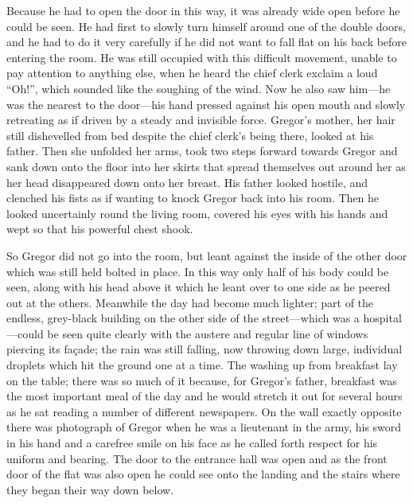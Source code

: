 Because he had to open the door in this way, it was already wide open
before he could be seen. He had first to slowly turn himself around one
of the double doors, and he had to do it very carefully if he did not
want to fall flat on his back before entering the room. He was still
occupied with this difficult movement, unable to pay attention to
anything else, when he heard the chief clerk exclaim a loud “Oh!”,
which sounded like the soughing of the wind. Now he also saw him—he was
the nearest to the door—his hand pressed against his open mouth and
slowly retreating as if driven by a steady and invisible force.
Gregor’s mother, her hair still dishevelled from bed despite the chief
clerk’s being there, looked at his father. Then she unfolded her arms,
took two steps forward towards Gregor and sank down onto the floor into
her skirts that spread themselves out around her as her head
disappeared down onto her breast. His father looked hostile, and
clenched his fists as if wanting to knock Gregor back into his room.
Then he looked uncertainly round the living room, covered his eyes with
his hands and wept so that his powerful chest shook.

So Gregor did not go into the room, but leant against the inside of the
other door which was still held bolted in place. In this way only half
of his body could be seen, along with his head above it which he leant
over to one side as he peered out at the others. Meanwhile the day had
become much lighter; part of the endless, grey-black building on the
other side of the street—which was a hospital—could be seen quite
clearly with the austere and regular line of windows piercing its
façade; the rain was still falling, now throwing down large, individual
droplets which hit the ground one at a time. The washing up from
breakfast lay on the table; there was so much of it because, for
Gregor’s father, breakfast was the most important meal of the day and
he would stretch it out for several hours as he sat reading a number of
different newspapers. On the wall exactly opposite there was photograph
of Gregor when he was a lieutenant in the army, his sword in his hand
and a carefree smile on his face as he called forth respect for his
uniform and bearing. The door to the entrance hall was open and as the
front door of the flat was also open he could see onto the landing and
the stairs where they began their way down below.

